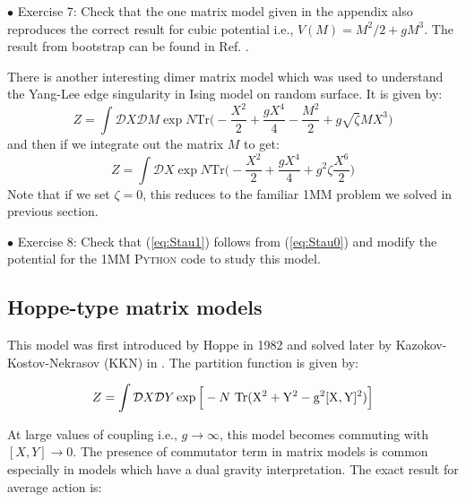 \documentclass[11pt]{article}
\newcommand{\PY}{\textsc{Python }}
\begin{document}
\begin{mdframed}[backgroundcolor=blue!3] 
	\textsc{} 
	$\bullet$ Exercise 7:  Check that the one matrix model given in the appendix also reproduces the correct result for cubic potential 
	i.e., $V(M) = M^2/2 + gM^3$. The result from bootstrap can be found in Ref. \cite{Kazakov:2021lel}. \\ 
\end{mdframed} 

There is another interesting dimer matrix model which was 
used to understand the Yang-Lee edge singularity \cite{Staudacher:1989fy} 
in Ising model on random surface.
It is given by: 
\begin{equation}
	\label{eq:Stau0}
	Z = \int \mathcal{D}X \mathcal{D}M \exp N \mbox{Tr}\Bigg(-\frac{X^2}{2} + \frac{gX^4}{4} - \frac{M^2}{2} + g \sqrt{\zeta} MX^3 \Bigg)
\end{equation}
and then if we integrate out the matrix $M$ to get:
\begin{equation}
	\label{eq:Stau1} 
	Z = \int \mathcal{D}X \exp N \mbox{Tr}\Bigg(-\frac{X^2}{2} + \frac{gX^4}{4} + g^2 \zeta  \frac{X^6}{2}   \Bigg)
\end{equation}
Note that if we set $\zeta=0$, this reduces to the familiar 1MM problem we solved in previous section. 


\begin{mdframed}[backgroundcolor=blue!3]  
	$\bullet$ Exercise 8: Check that (\ref{eq:Stau1}) follows from (\ref{eq:Stau0}) and modify the potential for the 1MM \PY code to study this model. 
\end{mdframed} 

\subsection{Hoppe-type matrix models}
This model was first introduced by Hoppe in 1982 and solved later by 
Kazokov-Kostov-Nekrasov (KKN) in \cite{Kazakov:1998ji}. The partition function is given by:

\begin{equation}
Z = \int \mathcal{D}X \mathcal{D}Y \exp \Big[-N ~ \rm{Tr} (X^2 + Y^2 - g^2 [X,Y]^2) \Big] 
\end{equation}

At large values of coupling i.e., $ g \to \infty$, this model becomes commuting with 
$ [X,Y] \to 0$. The presence of commutator term in matrix models is common especially in 
models which have a dual gravity interpretation. 
The exact result for average action is:
\end{document}
